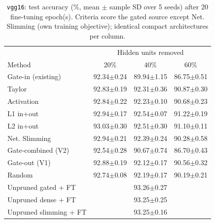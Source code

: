 \begin{table}[t]
\centering
\caption{\texttt{vgg16}: test accuracy (\%, mean $\pm$ sample SD over 5 seeds) after 20 fine-tuning epoch(s). Criteria score the gated source except Net. Slimming (own training objective); identical compact architectures per column.}
\label{tab:vgg16_main}
\footnotesize
\setlength{\tabcolsep}{2.5pt}
\begin{tabular}{lccc}
\toprule
 & \multicolumn{3}{c}{Hidden units removed} \\
Method & 20\% & 40\% & 60\% \\
\midrule
Gate-in (existing) & 92.34$\pm$0.24 & 89.94$\pm$1.15 & 86.75$\pm$0.51 \\
Taylor & 92.83$\pm$0.19 & 92.31$\pm$0.36 & 90.87$\pm$0.30 \\
Activation & 92.84$\pm$0.22 & 92.23$\pm$0.10 & 90.68$\pm$0.23 \\
L1 in+out & 92.94$\pm$0.17 & 92.54$\pm$0.07 & 91.22$\pm$0.19 \\
L2 in+out & 93.03$\pm$0.30 & 92.51$\pm$0.30 & 91.10$\pm$0.11 \\
Net. Slimming & 92.94$\pm$0.21 & 92.39$\pm$0.24 & 90.28$\pm$0.58 \\
Gate-combined (V2) & 92.54$\pm$0.28 & 90.67$\pm$0.74 & 86.70$\pm$0.43 \\
Gate-out (V1) & 92.88$\pm$0.19 & 92.12$\pm$0.17 & 90.56$\pm$0.32 \\
Random & 92.74$\pm$0.08 & 92.19$\pm$0.17 & 90.19$\pm$0.21 \\
\midrule
Unpruned gated + FT & \multicolumn{3}{c}{93.26$\pm$0.27} \\
Unpruned dense + FT & \multicolumn{3}{c}{93.25$\pm$0.25} \\
Unpruned slimming + FT & \multicolumn{3}{c}{93.25$\pm$0.16} \\
\bottomrule
\end{tabular}
\end{table}